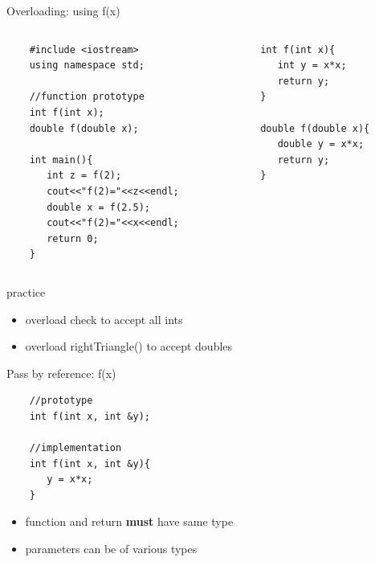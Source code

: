 \documentclass[xcolor={dvipsnames}]{beamer}
\begin{document}
\begin{frame}[fragile]{Overloading: using f(x)}
	\begin{columns}
	 \begin{column}{.49\textwidth}
	\begin{verbatim}
	#include <iostream>
	using namespace std;
		
	//function prototype
	int f(int x);
	double f(double x);

	int main(){
	   int z = f(2);
	   cout<<"f(2)="<<z<<endl;
	   double x = f(2.5);
	   cout<<"f(2)="<<x<<endl;
	   return 0;
	}
	\end{verbatim}
	\end{column}
	\pause
	\begin{column}{.49\textwidth}
	\begin{verbatim}
	int f(int x){
	   int y = x*x;
	   return y;
	}
   
	double f(double x){
	   double y = x*x;
	   return y;
	}
	
	\end{verbatim}
	\end{column}
	\end{columns}
\end{frame}

\begin{frame}{practice}
	\begin{itemize}
		\item overload check to accept all ints
		\item overload rightTriangle() to accept doubles
	\end{itemize}
\end{frame}

\begin{frame}[fragile]{Pass by reference: f(x)}
	\begin{center}
	 
	\begin{verbatim}
	//prototype
	int f(int x, int &y);

	//implementation
	int f(int x, int &y){
	   y = x*x;
	}   
	\end{verbatim}
	\end{center}
	\begin{center}
		\begin{itemize}
			\item function and return \textbf{must} have same type
			\item parameters can be of various types
		\end{itemize}
	\end{center}
\end{frame}
\end{document}
